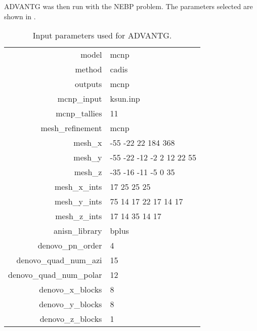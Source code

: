 ADVANTG was then run with the NEBP problem.
The parameters selected are shown in .

\begin{table}[h]\centering
\label{tab:advantg_params}
\caption{Input parameters used for ADVANTG.}
\begin{tabular}{ r | l }
\toprule
model                     &   mcnp\\
method                    &   cadis\\
outputs                   &   mcnp\\
mcnp\_input               &   ksun.inp\\
mcnp\_tallies             &   11\\
mesh\_refinement          &   mcnp\\
mesh\_x                   &   -55 -22 22 184 368\\
mesh\_y                   &   -55 -22 -12 -2 2 12 22 55\\
mesh\_z                   &   -35 -16 -11 -5 0 35\\
mesh\_x\_ints             &   17 25 25 25\\
mesh\_y\_ints             &   75 14 17 22 17 14 17\\
mesh\_z\_ints             &   17 14 35 14 17\\
anisn\_library            &   bplus\\
denovo\_pn\_order         &   4\\
denovo\_quad\_num\_azi    &   15\\
denovo\_quad\_num\_polar  &   12\\
denovo\_x\_blocks         &   8\\
denovo\_y\_blocks         &   8\\
denovo\_z\_blocks         &   1\\
\end{tabular}
\end{table}

